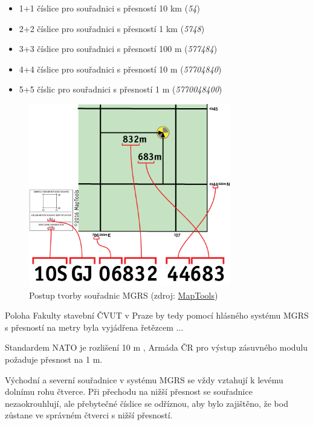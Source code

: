\begin{itemize}
		\begin{itemize}
				\item 1+1 číslice pro souřadnici s přesností 10 km (\textit{54})
				\item 2+2 číslice pro souřadnici s přesností 1 km (\textit{5748})
				\item 3+3 číslice pro souřadnici s přesností 100 m (\textit{577484})
				\item 4+4 číslice pro souřadnici s přesností 10 m (\textit{57704840})
				\item 5+5 číslic pro souřadnici s přesností 1 m (\textit{5770048400})
		\end{itemize}	
		 
\end{itemize}

\begin{figure}[H]
    \centering
      \includegraphics[width=250pt]{./pictures/MGRS_tvorba.png}
      \caption[Postup tvorby souřadnic MGRS]{Postup tvorby souřadnic MGRS
      (zdroj: \href{https://www.maptools.com/tutorials/mgrs/quick_guide}{MapTools})}
      \label{fig:maptools}
\end{figure}
  
Poloha Fakulty stavební ČVUT v Praze by tedy pomocí hlásného systému MGRS s přesností na metry byla vyjádřena řetězcem ...

Standardem NATO je rozlišení 10 m \cite{wiki}, Armáda ČR pro výstup zásuvného modulu požaduje přesnost na 1 m.

Východní a severní souřadnice v systému MGRS se vždy vztahují k levému dolnímu rohu čtverce. Při přechodu na nižší přesnost se souřadnice nezaokrouhlují, ale přebytečné číslice se odříznou, aby bylo zajištěno, že bod zůstane ve správném čtverci s nižší přesností.




